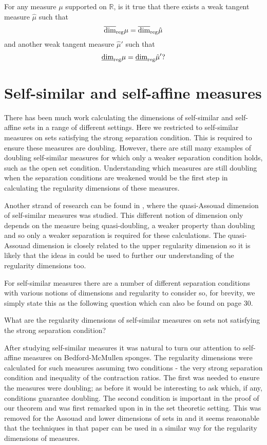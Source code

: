 \begin{question}
For any measure $\mu$ supported on $\mathbb{R}$, is it true that there exists a weak tangent measure $\hat{\mu}$ such that 
\[
\overline{\dim}_{\textup{reg}} \mu = \overline{\dim}_{\textup{reg}} \hat{\mu}
\]
and another weak tangent measure $\hat{\mu}'$ such that
\[
\underline{\dim}_{\textup{reg}} \mu = \underline{\dim}_{\textup{reg}} \hat{\mu}' ?
\]
\end{question}



\section{Self-similar and self-affine measures}\label{ch-conclusion:self-similar}

There has been much work calculating the dimensions of self-similar and self-affine sets in a range of different settings. Here we restricted to self-similar measures on sets satisfying the strong separation condition. This is required to ensure these measures are doubling. However, there are still many examples of doubling self-similar measures for which only a weaker separation condition holds, such as the open set condition. Understanding which measures are still doubling when the separation conditions are weakened would be the first step in calculating the regularity dimensions of these measures.

Another strand of research can be found in \cite{hare-hare-tros}, where the quasi-Assouad dimension of self-similar measures was studied. This different notion of dimension only depends on the measure being quasi-doubling, a weaker property than doubling and so only a weaker separation is required for these calculations. The quasi-Assouad dimension is closely related to the upper regularity dimension so it is likely that the ideas in \cite{hare-hare-tros} could be used to further our understanding of the regularity dimensions too. 

For self-similar measures there are a number of different separation conditions with various notions of dimensions and regularity to consider so, for brevity, we simply state this as the following question which can also be found on page 30.

\begin{question}
What are the regularity dimensions of self-similar measures on sets not satisfying the strong separation condition?
\end{question}


After studying self-similar measures it was natural to turn our attention to self-affine measures on Bedford-McMullen sponges. The regularity dimensions were calculated for such measures assuming two conditions - the very strong separation condition and inequality of the contraction ratios. The first was needed to ensure the measures were doubling; as before it would be interesting to ask which, if any, conditions guarantee doubling. The second condition is important in the proof of our theorem and was first remarked upon in \cite{fraser-howroyd1} in the set theoretic setting. This was removed for the Assouad and lower dimensions of sets in \cite{howroyd-sponges} and it seems reasonable that the techniques in that paper can be used in a similar way for the regularity dimensions of measures. 

